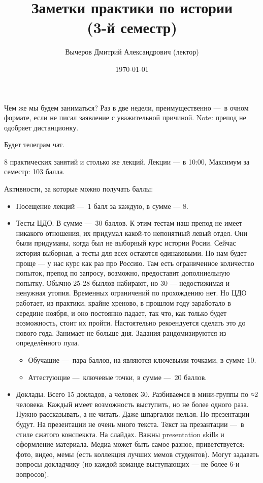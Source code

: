 \documentclass[12pt, a4paper]{article}
\title{Заметки практики по истории \\(3-й семестр)}
\author{
  \vova
  \and
  {Вычеров Дмитрий Александрович (лектор)}
}
\date{\today}
\begin{document}
  \tittoc

    Чем же мы будем заниматься?
    Раз в две недели, преимущественно — в очном формате, если не писал заявление с уважительной причиной.
    Note: препод не одобряет дистанционку.

    Будет телеграм чат.

    8 практических занятий и столько же лекций.
    Лекции — в 10:00, 
    Максимум за семестр: 103 балла.

    Активности, за которые можно получать баллы:

    \begin{itemize}
        \item Посещение лекций — 1 балл за каждую, в сумме — 8.
        \item Тесты ЦДО. В сумме — 30 баллов. К этим тестам наш препод не имеет никакого отношения, их придумал какой-то непонятный левый отдел.
        Они были придуманы, когда был не выборный курс истории Росии. Сейчас история выборная, а тесты для всех остаются одинаковыми. Но нам будет проще — у нас курс как раз про Россию.
        Там есть ограниченное количество попыток, препод по запросу, возможно, предоставит дополниельную попытку. Обычно 25-28 быллов набирают, но 30 — недостижимая и ненужная утопия. Временных ограничений по прохождению нет. 
        Но ЦДО работает, из практики, крайне хреново, в прошлом году заработало в середине ноября, и оно постоянно падает, 
        так что, как только будет возможность, стоит их пройти. Настоятельно рекоендуется сделать это до нового года. Занимает не больше дня.
        Задания рандомизируются из определённого пула.
        \begin{itemize}
            \item Обучащие — пара баллов, на являются ключевыми точками, в сумме 10.
            \item Аттестующие — ключевые точки, в сумме — 20 баллов.
        \end{itemize}
        \item Доклады. Всего 15 докладов, а человек 30. 
        Разбиваемся в мини-группы по ≈2 человека. Каждый имеет возможность выступить, но не более одного раза.
        Нужно рассказывать, а не читать. Даже шпаргалки нельзя. Но презентации будут. На презентации не очень много текста.
        Текст на презантации — в стиле сжатого конспеккта. На слайдах. Важны presentation skills и оформление материала.
        Медиа может быть самое разное, приветствуется: фото, видео, мемы (есть коллекция лучших мемов студентов). 
        Могут задавать вопросы докладчику (но каждой команде выступающих — не более 6-и вопросов).

\end{itemize}
\end{document}
